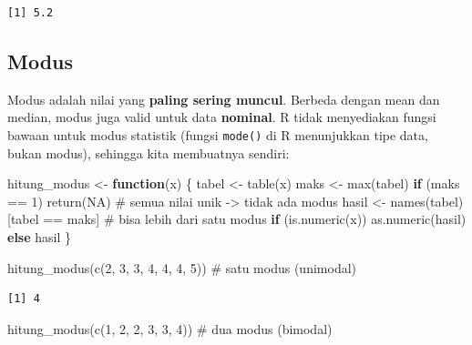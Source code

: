 \documentclass[
  indonesian,
  letterpaper,
]{book}
\newenvironment{Shaded}{\begin{snugshade}}{\end{snugshade}}
\newcommand{\CommentTok}[1]{\textcolor[rgb]{0.37,0.37,0.37}{#1}}
\newcommand{\ConstantTok}[1]{\textcolor[rgb]{0.56,0.35,0.01}{#1}}
\newcommand{\ControlFlowTok}[1]{\textcolor[rgb]{0.00,0.23,0.31}{\textbf{#1}}}
\newcommand{\DecValTok}[1]{\textcolor[rgb]{0.68,0.00,0.00}{#1}}
\newcommand{\FunctionTok}[1]{\textcolor[rgb]{0.28,0.35,0.67}{#1}}
\newcommand{\NormalTok}[1]{\textcolor[rgb]{0.00,0.23,0.31}{#1}}
\newcommand{\OtherTok}[1]{\textcolor[rgb]{0.00,0.23,0.31}{#1}}
\newcommand{\SpecialCharTok}[1]{\textcolor[rgb]{0.37,0.37,0.37}{#1}}
\begin{document}
\begin{verbatim}
[1] 5.2
\end{verbatim}

\subsection{Modus}\label{modus}

Modus adalah nilai yang \textbf{paling sering muncul}. Berbeda dengan
mean dan median, modus juga valid untuk data \textbf{nominal}. R tidak
menyediakan fungsi bawaan untuk modus statistik (fungsi \texttt{mode()}
di R menunjukkan tipe data, bukan modus), sehingga kita membuatnya
sendiri:

\begin{Shaded}
\begin{Highlighting}[]
\NormalTok{hitung\_modus }\OtherTok{\textless{}{-}} \ControlFlowTok{function}\NormalTok{(x) \{}
\NormalTok{tabel }\OtherTok{\textless{}{-}} \FunctionTok{table}\NormalTok{(x)}
\NormalTok{maks }\OtherTok{\textless{}{-}} \FunctionTok{max}\NormalTok{(tabel)}
\ControlFlowTok{if}\NormalTok{ (maks }\SpecialCharTok{==} \DecValTok{1}\NormalTok{) }\FunctionTok{return}\NormalTok{(}\ConstantTok{NA}\NormalTok{)                     }\CommentTok{\# semua nilai unik {-}\textgreater{} tidak ada modus}
\NormalTok{hasil }\OtherTok{\textless{}{-}} \FunctionTok{names}\NormalTok{(tabel)[tabel }\SpecialCharTok{==}\NormalTok{ maks]          }\CommentTok{\# bisa lebih dari satu modus}
\ControlFlowTok{if}\NormalTok{ (}\FunctionTok{is.numeric}\NormalTok{(x)) }\FunctionTok{as.numeric}\NormalTok{(hasil) }\ControlFlowTok{else}\NormalTok{ hasil}
\NormalTok{\}}

\FunctionTok{hitung\_modus}\NormalTok{(}\FunctionTok{c}\NormalTok{(}\DecValTok{2}\NormalTok{, }\DecValTok{3}\NormalTok{, }\DecValTok{3}\NormalTok{, }\DecValTok{4}\NormalTok{, }\DecValTok{4}\NormalTok{, }\DecValTok{4}\NormalTok{, }\DecValTok{5}\NormalTok{))   }\CommentTok{\# satu modus (unimodal)}
\end{Highlighting}
\end{Shaded}

\begin{verbatim}
[1] 4
\end{verbatim}

\begin{Shaded}
\begin{Highlighting}[]
\FunctionTok{hitung\_modus}\NormalTok{(}\FunctionTok{c}\NormalTok{(}\DecValTok{1}\NormalTok{, }\DecValTok{2}\NormalTok{, }\DecValTok{2}\NormalTok{, }\DecValTok{3}\NormalTok{, }\DecValTok{3}\NormalTok{, }\DecValTok{4}\NormalTok{))      }\CommentTok{\# dua modus (bimodal)}
\end{Highlighting}
\end{Shaded}
\end{document}
